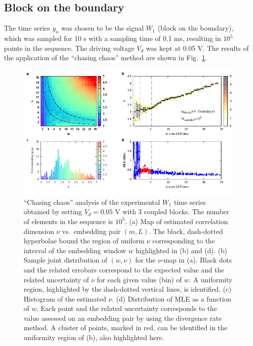 \subsection{Block on the boundary}\label{subsec: 3 blocks chaos boundary}

The time series $y_n$ was chosen to be the signal $W_1$ (block on the boundary),
which was sampled for 10 s with a sampling time of 0.1 ms, resulting in $10^5$ points in the sequence.
The driving voltage $V_d$ was kept at 0.05 V. The results of the application of the
``chasing chaos'' method are shown in Fig.~\ref{fig:3 blocks chaos boundary 1e5}.

\begin{figure}[ht!]
    \centering
    \includegraphics[width=\linewidth]{../blocks/3_blocks/edge/1e5_points/plots/chaos_low.pdf}
    \caption{``Chasing chaos'' analysis of the experimental $W_1$ time series obtained by setting $V_d=0.05$ V with 3 coupled blocks.
    The number of elements in the sequence is $10^5$.
    (a) Map of estimated correlation dimension $\nu$ vs.\ embedding pair $(m, L)$.
    The black, dash-dotted hyperbolae bound the region of uniform $\nu$ corresponding to the interval of the
    embedding window $w$ highlighted in (b) and (d).
    (b) Sample joint distribution of $(w,\nu)$ for the $\nu$-map in (a).
    Black dots and the related errobars correspond to the expected value and the related uncertainty of $\nu$
    for each given value (bin) of $w$. A uniformity region, highlighted by the dash-dotted vertical lines,
    is identified. (c) Histogram of the estimated $\nu$. (d) Distribution of MLE as a function of $w$. Each point and the related
    uncertainty corresponds to the value assessed on an embedding pair by using the divergence rate method.
    A cluster of points, marked in red, can be identified in the uniformity region of (b), also highlighted here.
    }\label{fig:3 blocks chaos boundary 1e5}
\end{figure}

